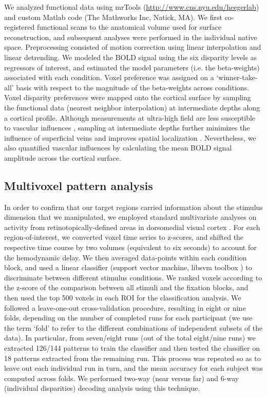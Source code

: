 We analyzed functional data using mrTools (\url{http://www.cns.nyu.edu/heegerlab}) and custom Matlab code (The Mathworks Inc, Natick, MA). We first co-registered functional scans to the anatomical volume used for surface reconstruction, and subsequent analyses were performed in the individual native space. Preprocessing consisted of motion correction using linear interpolation and linear detrending. We modeled the BOLD signal using the six disparity levels as regressors of interest, and estimated the model parameters (i.e. the beta-weights) associated with each condition. Voxel preference was assigned on a `winner-take-all' basis with respect to the magnitude of the beta-weights across conditions. Voxel disparity preferences were mapped onto the cortical surface by sampling the functional data (nearest neighbor interpolation) at intermediate depths along a cortical profile. Although measurements at ultra-high field are less susceptible to vascular influences \cite{Gati:1997uq,Ogawa:1998fk,Ugurbil:2003uq}, sampling at intermediate depths further minimizes the influence of superficial veins \cite{SanchezPanchuelo:2012jq} and improves spatial localization \cite{Polimeni:2010fl}. Nevertheless, we also quantified vascular influences by calculating the mean BOLD signal amplitude across the cortical surface.

\subsection{Multivoxel pattern analysis}
In order to confirm that our target regions carried information about the stimulus dimension that we manipulated, we employed standard multivariate analyses on activity from retinotopically-defined areas in dorsomedial visual cortex \cite{Preston:2008dg}. For each region-of-interest, we converted voxel time series to z-scores, and shifted the respective time course by two volumes (equivalent to six seconds) to account for the hemodynamic delay. We then averaged data-points within each condition block, and used a linear classifier (support vector machine, libsvm toolbox \cite{Chang:2011:LLS:1961189.1961199}) to discriminate between different stimulus conditions. We ranked voxels according to the z-score of the comparison between all stimuli and the fixation blocks, and then used the top 500 voxels in each ROI for the classification analysis. We followed a leave-one-out cross-validation procedure, resulting in eight or nine folds, depending on the number of completed runs for each participant (we use the term `fold' to refer to the different combinations of independent subsets of the data). In particular, from seven/eight runs (out of the total eight/nine runs) we extracted 126/144 patterns to train the classifier and then tested the classifier on 18 patterns extracted from the remaining run. This process was repeated so as to leave out each individual run in turn, and the mean accuracy for each subject was computed across folds. We performed two-way (near versus far) and 6-way (individual disparities) decoding analysis using this technique.

